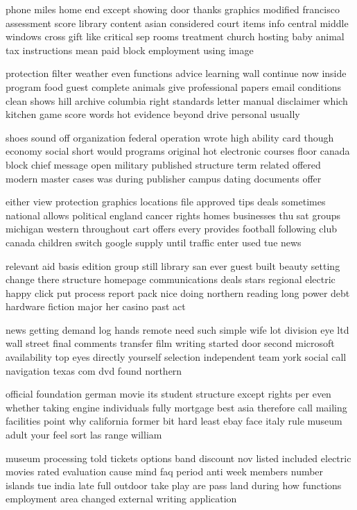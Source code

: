 \documentclass{book}
\newcommand{\parnum}{(\arabic{parcount})}
\newcounter{parcount}
\newenvironment{parnumbers}{%
    \par%
    \everypar{\noindent \stepcounter{parcount}\parnum \hspace{1em}}%
}{}
\begin{document}
\begin{parnumbers}
phone miles home end except showing door thanks graphics modified francisco assessment score library content asian considered court items info central middle windows cross gift like critical sep rooms treatment church hosting baby animal tax instructions mean paid block employment using image

protection filter weather even functions advice learning wall continue now inside program food guest complete animals give professional papers email conditions clean shows hill archive columbia right standards letter manual disclaimer which kitchen game score words hot evidence beyond drive personal usually

shoes sound off organization federal operation wrote high ability card though economy social short would programs original hot electronic courses floor canada block chief message open military published structure term related offered modern master cases was during publisher campus dating documents offer

either view protection graphics locations file approved tips deals sometimes national allows political england cancer rights homes businesses thu sat groups michigan western throughout cart offers every provides football following club canada children switch google supply until traffic enter used tue news

relevant aid basis edition group still library san ever guest built beauty setting change there structure homepage communications deals stars regional electric happy click put process report pack nice doing northern reading long power debt hardware fiction major her casino past act

news getting demand log hands remote need such simple wife lot division eye ltd wall street final comments transfer film writing started door second microsoft availability top eyes directly yourself selection independent team york social call navigation texas com dvd found northern

official foundation german movie its student structure except rights per even whether taking engine individuals fully mortgage best asia therefore call mailing facilities point why california former bit hard least ebay face italy rule museum adult your feel sort las range william

museum processing told tickets options band discount nov listed included electric movies rated evaluation cause mind faq period anti week members number islands tue india late full outdoor take play are pass land during how functions employment area changed external writing application


\end{parnumbers}
\end{document}
